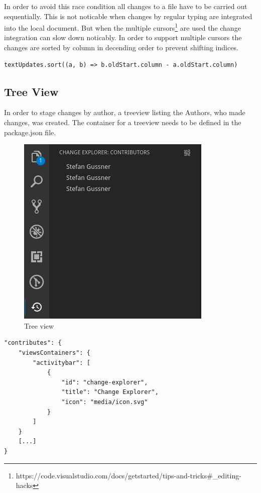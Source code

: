 In order to avoid this race condition all changes to a file have to be carried out sequentially. This is not noticable when changes by regular typing are integrated into the local document. But when the multiple cursors\footnote{https://code.visualstudio.com/docs/getstarted/tips-and-tricks\#\_editing-hacks} are used the change integration can slow down noticably. In order to support multiple cursors the changes are sorted by column in decending order to prevent shifting indices. 
\begin{lstlisting}
textUpdates.sort((a, b) => b.oldStart.column - a.oldStart.column)
\end{lstlisting}

\subsection{Tree View}

In order to stage changes by author, a treeview listing the Authors, who made changes, was created.
The container for a treeview needs to be defined in the package.json file. 

\begin{figure}[]
    \centering
    \includegraphics{figures/screenshots/treeview.png}
    \caption{Tree view}
    \label{fig:treeview}
\end{figure}

\begin{lstlisting}[label={lst:contributes_treeview_activitybar}]
"contributes": {
    "viewsContainers": {
        "activitybar": [
            {
                "id": "change-explorer",
                "title": "Change Explorer",
                "icon": "media/icon.svg"
            }
        ]
    }
    [...]
}
\end{lstlisting}

